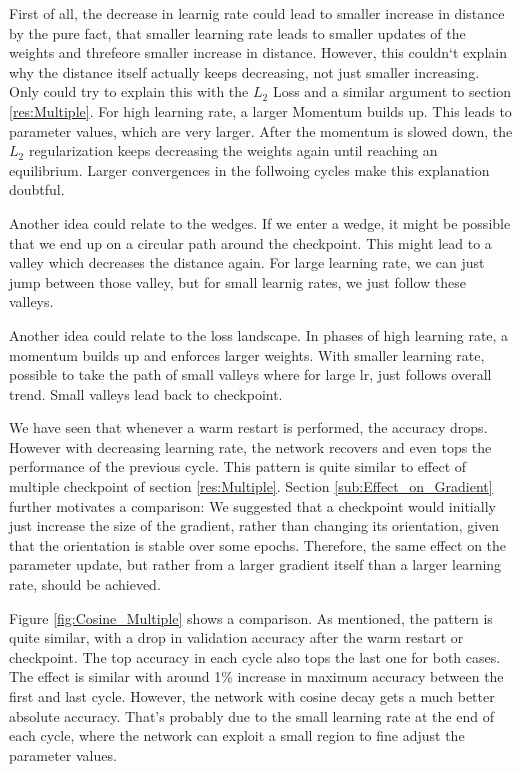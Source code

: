 First of all, the decrease in learnig rate could lead to smaller increase in
distance by the pure fact, that smaller learning rate leads to smaller updates
of the weights and threfeore smaller increase in distance. However, this
couldn`t explain why the distance itself actually keeps decreasing, not just
smaller increasing. Only could try to explain this with the $L_2$ Loss and a
similar argument to section \ref{res:Multiple}. For high learning rate, a larger
Momentum builds up. This leads to parameter values, which are very larger. After
the momentum is slowed down, the $L_2$ regularization keeps decreasing the
weights again until reaching an equilibrium. Larger convergences in the
follwoing cycles make this explanation doubtful. 

Another idea could relate to the wedges. If we enter a wedge, it might be
possible that we end up on a circular path around the checkpoint. This might
lead to a valley which decreases the distance again. For large learning rate, we
can just jump between those valley, but for small learnig rates, we just follow
these valleys.

Another idea could relate to the loss landscape. In phases of high learning
rate, a momentum builds up and enforces larger weights. With smaller learning
rate, possible to take the path of small valleys where for large lr, just
follows overall  trend. Small valleys lead back to checkpoint.



We have seen that whenever a warm restart is performed, the accuracy drops.
However with decreasing learning rate, the network recovers and even tops the
performance of the previous cycle. This pattern is quite similar to effect of
multiple checkpoint of section \ref{res:Multiple}. Section
\ref{sub:Effect_on_Gradient} further motivates a comparison: We suggested that a
checkpoint would initially just increase the size of the gradient, rather than
changing its orientation, given that the orientation is stable over some epochs.
Therefore, the same effect on the parameter update, but rather from a larger
gradient itself than a larger learning rate, should be achieved.

Figure \ref{fig:Cosine_Multiple} shows a comparison. As mentioned, the pattern
is quite similar, with a drop in validation accuracy after the warm restart or
checkpoint. The top accuracy in each cycle also tops the last one for both
cases. The effect is similar with around 1\% increase in maximum accuracy
between the first and last cycle. However, the network with cosine decay gets a
much better absolute accuracy. That's probably due to the small learning rate at
the end of each cycle, where the network can exploit a small region to fine
adjust the parameter values.

